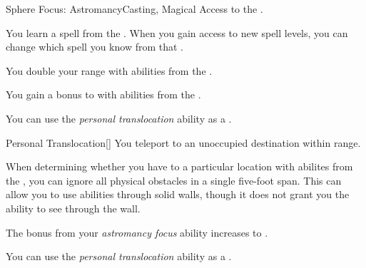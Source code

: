     \begin{feat}{Sphere Focus: Astromancy}{Casting, Magical}
        \featpre Access to the  .

         You learn a spell from the  .
        When you gain access to new spell levels, you can change which spell you know from that .

         You double your range with abilities from the  .

         You gain a  bonus to  with abilities from the  .

         You can use the \textit{personal translocation} ability as a .
        \begin{freeability}{Personal Translocation}[]
            You teleport to an unoccupied destination within \rngclose range.
        \end{freeability}

         When determining whether you have  to a particular location with abilites from the  , you can ignore all physical obstacles in a single five-foot span.
        This can allow you to use abilities through solid walls, though it does not grant you the ability to see through the wall.

         The bonus from your \textit{astromancy focus} ability increases to .

         You can use the \textit{personal translocation} ability as a .
    \end{feat}

